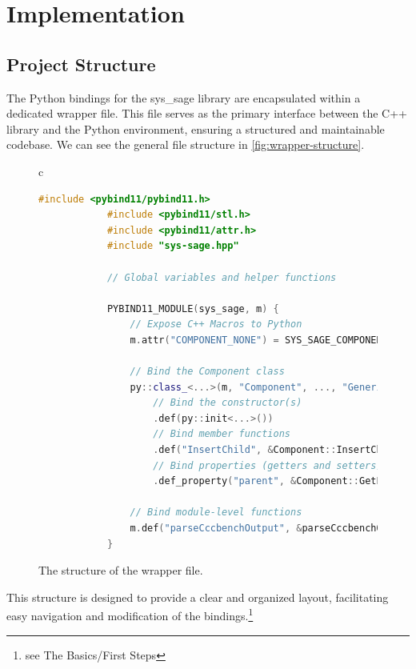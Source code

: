 \chapter{Implementation}\label{chapter:Implementation}

\section{Project Structure}

The Python bindings for the sys\_sage library are encapsulated within a dedicated wrapper file. This file serves as the primary interface between the C++ library and the Python environment, ensuring a structured and maintainable codebase. We can see the general file structure in \autoref{fig:wrapper-structure}.
\begin{figure}[h]
    \centering
    \begin{tabular}{c}
        \begin{lstlisting}[language=C++]
            #include <pybind11/pybind11.h>
            #include <pybind11/stl.h>
            #include <pybind11/attr.h>
            #include "sys-sage.hpp"
            
            // Global variables and helper functions
            
            PYBIND11_MODULE(sys_sage, m) {
                // Expose C++ Macros to Python
                m.attr("COMPONENT_NONE") = SYS_SAGE_COMPONENT_NONE;
            
                // Bind the Component class
                py::class_<...>(m, "Component", ..., "Generic Component")
                    // Bind the constructor(s)
                    .def(py::init<...>())
                    // Bind member functions
                    .def("InsertChild", &Component::InsertChild, ...)
                    // Bind properties (getters and setters)
                    .def_property("parent", &Component::GetParent, &Component::SetParent, ...);
            
                // Bind module-level functions
                m.def("parseCccbenchOutput", &parseCccbenchOutput, ...);
            }
            \end{lstlisting}
    \end{tabular}
    \caption[Structure of the wrapper file]{The structure of the wrapper file.}\label{fig:wrapper-structure}
  \end{figure}


This structure is designed to provide a clear and organized layout, facilitating easy navigation and modification of the bindings.\cite{pybind11-docu}\footnote{see The Basics/First Steps\label{fn:first-steps}}

